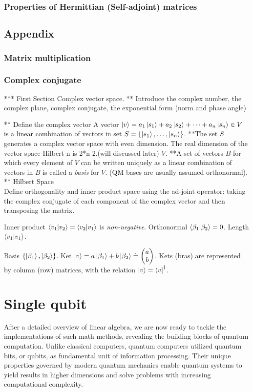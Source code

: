\documentclass[12pt]{article}
\begin{document}
\subsubsection{Properties of Hermittian (Self-adjoint) matrices}
\subsection{Appendix}
\subsubsection{Matrix multiplication}
\subsubsection{Complex conjugate}
*** First Section Complex vector space.
** Introduce the complex number, the complex plane, complex conjugate, the exponential form (norm and phase angle)

** Define the complex vector
A vector $\ket{v} = a_1\ket{s_1} + a_2\ket{s_2} + \cdots + a_n\ket{s_n} \in V$
is a linear combination of vectors in set $S = \{\ket{s_1}, \ldots,
\ket{s_n}\}$.
**The set $S$ generates a complex vector space with even dimension. The real dimension of the vector space Hilbert n is 2*n-2.(will discussed later)  $V$.
**A set of vectors $B$ for which every element of $V$ can be written uniquely as
a linear combination of vectors in $B$ is called a \emph{basis} for $V$. (QM
bases are usually assumed orthonormal).
** Hilbert Space\\
Define orthogonality and inner product space using the ad-joint operator: taking the complex conjugate of each component of the complex vector and then transposing the matrix.

Inner product $\braket{v_1}{v_2} = \braket{v_2}{v_1}$ is \emph{non-negative}.
Orthonormal $\braket{\beta_1}{\beta_2} = 0$. Length $\braket{v_1}{v_1}$.

Basis $\{\ket{\beta_1}, \ket{\beta_2}\}$. Ket $\ket{v} = a\ket{\beta_1} +
b\ket{\beta_2} \doteq \pmqty{a\\b}$. Kets (bras) are represented by column
(row) matrices, with the relation $\ket{v}=\bra{v}^\dag$. 

\section{Single qubit}


After a detailed overview of linear algebra, we are now ready to tackle the implementations of such math methods, revealing the building blocks of quantum computation. Unlike classical computers, quantum computers utilized quantum bits, or qubits, as fundamental unit of information processing. Their unique properties governed by modern quantum mechanics enable quantum systems to yield results in higher dimensions and solve problems with increasing computational complexity.
\end{document}
